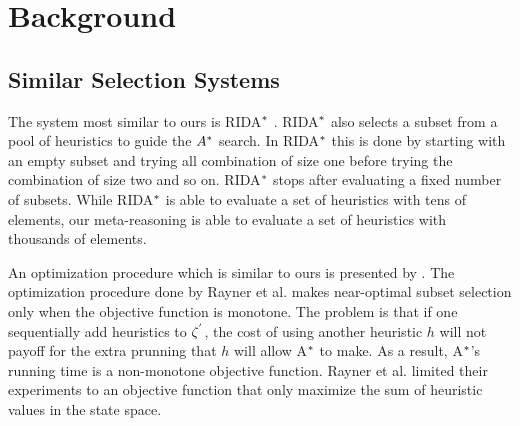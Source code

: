 
 
\chapter{Background}\label{ch:background}

\section{Similar Selection Systems}

\noindent
The system most similar to ours is RIDA$\sp{*}$ \cite{BarleySantiagoOver}. RIDA$\sp{*}$ also selects a subset from a pool of heuristics to guide the $A\sp{*}$ search. In RIDA$\sp{*}$ this is done by starting with an empty subset and trying all combination of size one before trying the combination of size two and so on. RIDA$\sp{*}$ stops after evaluating a fixed number of subsets. While RIDA$\sp{*}$ is able to evaluate a set of heuristics with tens of elements, our meta-reasoning is able to evaluate a set of heuristics with thousands of elements.

An optimization procedure which is similar to ours is presented by \cite{raynersss13}. The optimization procedure done by Rayner et al. makes near-optimal subset selection only when the objective function is monotone. The problem is that if one sequentially add heuristics to $\zeta\sp{'}$, the cost of using another heuristic $h$ will not payoff for the extra prunning that $h$ will allow A$\sp{*}$ to make. As a result, A$\sp{*}$'s running time is a non-monotone objective function. Rayner et al. limited their experiments to an objective function that only maximize the sum of heuristic values in the state space.\\

